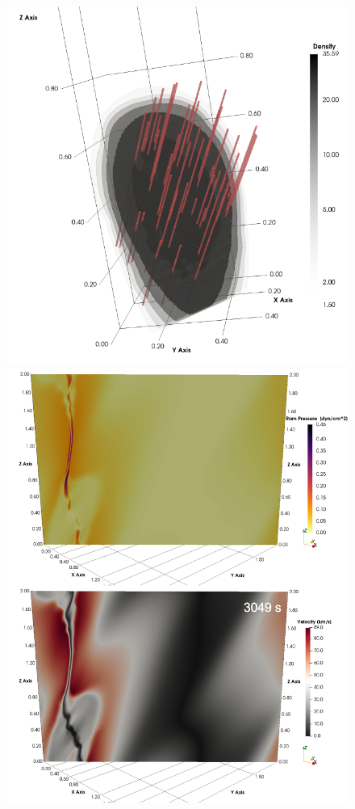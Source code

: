 \begin{figure}[t]
  \begin{minipage}{0.45\textwidth}
    \centering
    \includegraphics[width=\textwidth]{3d_instability_onset.png}
  \end{minipage}
  \begin{minipage}{0.54\textwidth}
    \centering
    \includegraphics[width=\textwidth]{3d_pressure_velocity.png}

\end{minipage}
\end{figure}
